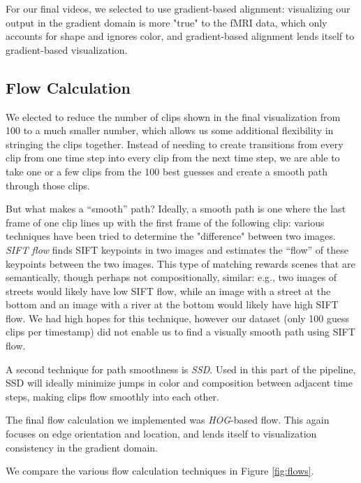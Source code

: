 For our final videos, we selected to use gradient-based alignment: visualizing our output in the gradient domain is more "true" to the fMRI data, which only accounts for shape and ignores color, and gradient-based alignment lends itself to gradient-based visualization.

\subsection{Flow Calculation}
We elected to reduce the number of clips shown in the final visualization from 100 to a much smaller number, which allows us some additional flexibility in stringing the clips together.  Instead of needing to create transitions from every clip from one time step into every clip from the next time step, we are able to take one or a few clips from the 100 best guesses and create a smooth path through those clips.

But what makes a ``smooth'' path?  Ideally, a smooth path is one where the last frame of one clip lines up with the first frame of the following clip: various techniques have been tried to determine the "difference" between two images.  \emph{SIFT flow} \cite{SIFTflow} finds SIFT keypoints in two images and estimates the ``flow'' of these keypoints between the two images.  This type of matching rewards scenes that are semantically, though perhaps not compositionally, similar: e.g., two images of streets would likely have low SIFT flow, while an image with a street at the bottom and an image with a river at the bottom would likely have high SIFT flow.  We had high hopes for this technique, however our dataset (only 100 guess clips per timestamp) did not enable us to find a visually smooth path using SIFT flow.

A second technique for path smoothness is \emph{SSD}.  Used in this part of the pipeline, SSD will ideally minimize jumps in color and composition between adjacent time steps, making clips flow smoothly into each other.

The final flow calculation we implemented was \emph{HOG}-based flow.  This again focuses on edge orientation and location, and lends itself to visualization consistency in the gradient domain.

We compare the various flow calculation techniques in Figure \ref{fig:flows}.

